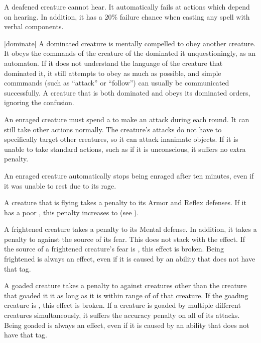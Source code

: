      A deafened creature cannot hear. It automatically fails at actions which depend on hearing. In addition, it has a 20\% failure chance when casting any spell with verbal components.

    [dominate] A dominated creature is mentally compelled to obey another creature.
    It obeys the commands of the creature of the dominated it unquestioningly, as an automaton.
    If it does not understand the language of the creature that dominated it, it still attempts to obey as much as possible, and simple commmands (such as ``attack'' or ``follow'') can usually be communicated successfully.
    A creature that is both dominated and \confused obeys its dominated orders, ignoring the confusion.

     An enraged creature must spend a  to make an attack during each round.
    It can still take other actions normally.
    The creature's attacks do not have to specifically target other creatures, so it can attack inanimate objects.
    If it is unable to take standard actions, such as if it is unconscious, it suffers no extra penalty.

    An enraged creature automatically stops being enraged after ten minutes, even if it was unable to rest due to its rage.

     A creature that is flying takes a  penalty to its Armor and Reflex defenses.
    If it has a poor , this penalty increases to  (see ).

     A frightened creature takes a  penalty to its Mental defense.
    In addition, it takes a  penalty to  against the source of its fear.
    This does not stack with the \panicked effect.
    If the source of a frightened creature's fear is , this effect is broken.
    Being frightened is always an  effect, even if it is caused by an ability that does not have that tag.

     A goaded creature takes a  penalty to  against creatures other than the creature that goaded it it as long as it is within \rngmed range of of that creature.
    If the goading creature is , this effect is broken.
    If a creature is goaded by multiple different creatures simultaneously, it suffers the accuracy penalty on all of its attacks.
    Being goaded is always an  effect, even if it is caused by an ability that does not have that tag.

